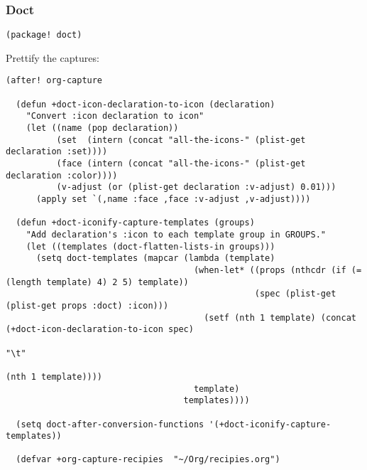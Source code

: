 \documentclass[c]{article}
\theoremstyle{plain}%
\theoremstyle{definition}
\theoremstyle{remark}
\begin{document}
\subsubsection{Doct}
\label{sec:orgf7c43f4}
\begin{verbatim}
(package! doct)
\end{verbatim}
Prettify the captures:
\begin{verbatim}
(after! org-capture

  (defun +doct-icon-declaration-to-icon (declaration)
    "Convert :icon declaration to icon"
    (let ((name (pop declaration))
          (set  (intern (concat "all-the-icons-" (plist-get declaration :set))))
          (face (intern (concat "all-the-icons-" (plist-get declaration :color))))
          (v-adjust (or (plist-get declaration :v-adjust) 0.01)))
      (apply set `(,name :face ,face :v-adjust ,v-adjust))))

  (defun +doct-iconify-capture-templates (groups)
    "Add declaration's :icon to each template group in GROUPS."
    (let ((templates (doct-flatten-lists-in groups)))
      (setq doct-templates (mapcar (lambda (template)
                                     (when-let* ((props (nthcdr (if (= (length template) 4) 2 5) template))
                                                 (spec (plist-get (plist-get props :doct) :icon)))
                                       (setf (nth 1 template) (concat (+doct-icon-declaration-to-icon spec)
                                                                      "\t"
                                                                      (nth 1 template))))
                                     template)
                                   templates))))

  (setq doct-after-conversion-functions '(+doct-iconify-capture-templates))

  (defvar +org-capture-recipies  "~/Org/recipies.org")


\end{verbatim}
\end{document}
